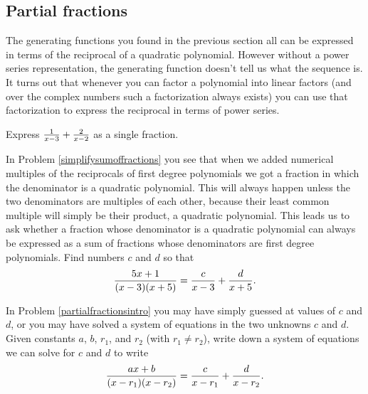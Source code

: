 \subsection{Partial fractions}  The generating functions you found in the
previous section all can be expressed in terms of the reciprocal of a
quadratic polynomial.  However without a power series representation, the
generating function doesn't tell us what the sequence is.  It turns out
that whenever you can factor a polynomial into linear factors (and over
the complex numbers such a factorization always exists) you can use that
factorization to express the reciprocal in terms of power series.

\bp
\iteme Express ${1\over x-3 } + {2\over x-2}$ as a single
fraction.\label{simplifysumoffractions}

\itemm In Problem \ref{simplifysumoffractions} you see that when we added
numerical multiples of the reciprocals of first degree polynomials we got
a fraction in which the denominator is a quadratic polynomial.  This will
always happen unless the two denominators are multiples of each other,
because their least common multiple will simply be their product, a
quadratic polynomial.  This leads us to ask whether a fraction whose
denominator is a quadratic polynomial can always be expressed as a sum of
fractions whose denominators are first degree polynomials.  Find numbers
$c$ and $d$ so that
$${5x+1\over(x-3)(x+5)} = {c\over x-3} + {d\over
x+5}.$$\label{partialfractionsintro}


\iteme In Problem \ref{partialfractionsintro} you may have simply guessed
at values of
$c$ and $d$, or you may have solved a system of equations in the two
unknowns
$c$ and $d$.  Given constants $a$, $b$, $r_1$, and $r_2$ (with $r_1\not=
r_2$), write down a system of equations we can solve for
$c$ and
$d$ to write 
$${ax+b\over (x-r_1)(x-r_2)} = {c\over x-r_1} + {d\over
x-r_2}.$$\label{partialfractions1}


